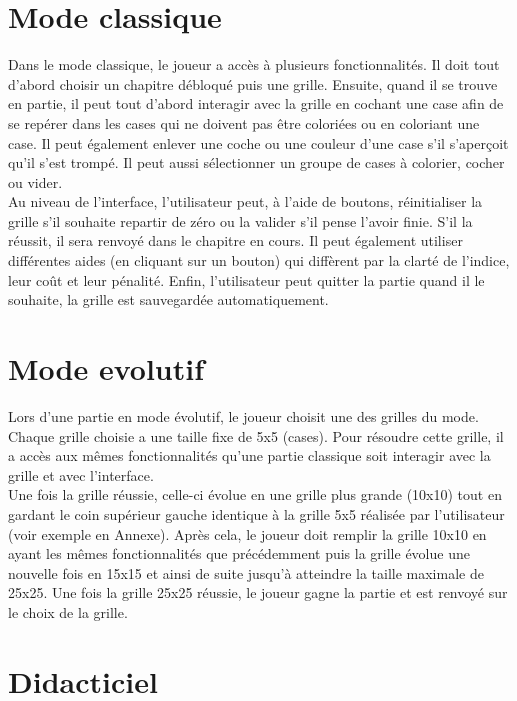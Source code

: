 \documentclass{report}
\begin{document}
      
	\section{Mode classique}
		Dans le mode classique, le joueur a accès à plusieurs fonctionnalités. Il doit tout d'abord choisir un chapitre débloqué puis une grille. Ensuite, quand il se trouve en partie, il peut tout d'abord interagir avec la grille en cochant une case afin de se repérer dans les cases qui ne doivent pas être coloriées ou en coloriant une case. Il peut également enlever une coche ou une couleur d'une case s'il s'aperçoit qu'il s'est trompé. Il peut aussi sélectionner un groupe de cases à colorier, cocher ou vider. \\
		Au niveau de l'interface, l'utilisateur peut, à l'aide de boutons, réinitialiser la grille s'il souhaite repartir de zéro ou la valider s'il pense l'avoir finie. S'il la réussit, il sera renvoyé dans le chapitre en cours. Il peut également utiliser différentes aides (en cliquant sur un bouton) qui diffèrent par la clarté de l'indice, leur coût et leur pénalité. Enfin, l'utilisateur peut quitter la partie quand il le souhaite, la grille est sauvegardée automatiquement.
	
	\section{Mode evolutif}
	
	Lors d'une partie en mode évolutif, le joueur choisit une des grilles du mode. Chaque grille choisie a une taille fixe de 5x5 (cases). Pour résoudre cette grille, il a accès aux mêmes fonctionnalités qu'une partie classique soit interagir avec la grille et avec l'interface. \\
Une fois la grille réussie, celle-ci évolue en une grille plus grande (10x10) tout en gardant le coin supérieur gauche identique à la grille 5x5 réalisée par l'utilisateur (voir exemple en Annexe). Après cela, le joueur doit remplir la grille 10x10 en ayant les mêmes fonctionnalités que précédemment puis la grille évolue une nouvelle fois en 15x15 et ainsi de suite jusqu'à atteindre la taille maximale de 25x25. Une fois la grille 25x25 réussie, le joueur gagne la partie et est renvoyé sur le choix de la grille.
	
	
	\section{Didacticiel}
	
\end{document}
